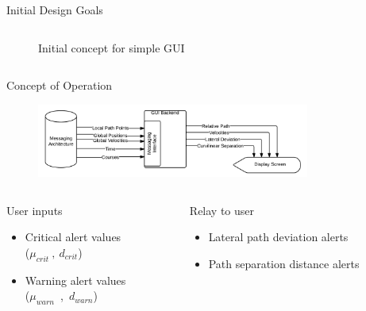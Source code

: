 \documentclass{beamer}
\begin{document}
\begin{frame}{Initial Design Goals}
\begin{columns}
\begin{column}{0.5\linewidth}
\begin{figure}
            \caption{\footnotesize Initial concept for simple GUI}
          \end{figure}
        \end{column}
      \end{columns}
    \end{frame}


    \begin{frame}{Concept of Operation}
      \begin{figure}
        \includegraphics[width=0.8\textwidth]{../graphics/blackbox_flowchart.png}
      \end{figure}
      \begin{columns}  
        \begin{column}{0.5\textwidth}
          \footnotesize User inputs
          \begin{itemize} \footnotesize
            \item Critical alert values\\ ($\mu_{crit}~,~d_{crit}$)
            \item Warning alert values\\ ($\mu_{warn}$~,~$d_{warn}$)
          \end{itemize}
        \end{column}
        \begin{column}{0.5\textwidth}
          \footnotesize Relay to user
          \begin{itemize} \footnotesize
            \item Lateral path deviation alerts
            \item Path separation distance alerts
          \end{itemize}
        \end{column}
      \end{columns}
    \end{frame}

      
\end{document}
